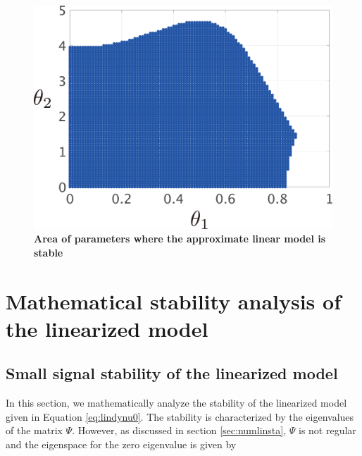 \documentclass[graybox, envcountchap]{svmult}
\begin{document}
\begin{figure}[t!]
{\begin{minipage}{0.49\linewidth}
    \medskip
  \end{minipage}
  \begin{minipage}{0.49\linewidth}
    \centering
    \includegraphics[width = 0.90\linewidth]{figs/Y0.01D0.01}
    \medskip
  \end{minipage}
}
 \caption{\textbf{Area of parameters where the approximate linear model is stable}}
 \label{fig:stacheck}
\medskip
\end{figure}


\section{Mathematical stability analysis of the linearized
model\advanced}\label{sec:linmathana}

\subsection{Small signal stability of the linearized model}
In this section, we mathematically analyze the stability of the linearized model
given in Equation \ref{eq:lindynu0}. The stability is characterized by the
eigenvalues of the matrix $\Psi$. However, as discussed in section
\ref{sec:numlinsta}, $\Psi$ is not regular and the eigenspace for the zero
eigenvalue is given by
\end{document}

